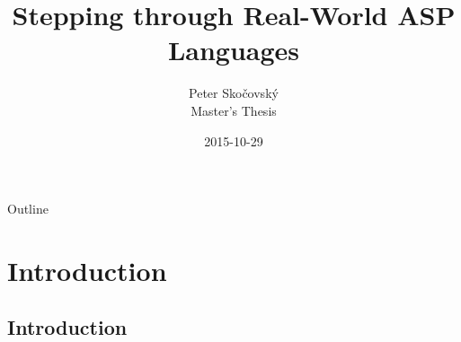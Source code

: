 \documentclass{beamer}
\title[Stepping through ASP]
{Stepping through Real-World ASP Languages}
\author[P. Skočovský]
{
	Peter Skočovský\\
	\scriptsize
	Master's Thesis
}
\date
{2015-10-29}
\begin{document}
\begin{frame}
	\titlepage
\end{frame}

\begin{frame}{Outline}
	\tableofcontents
\end{frame}



\section{Introduction}


\subsection{Introduction}
\end{document}
